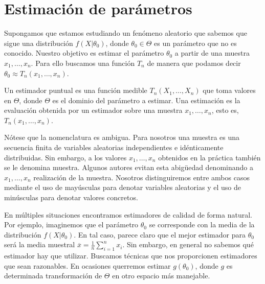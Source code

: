 

\section{Estimación de parámetros} \label{sec:estimacion}

Supongamos que estamos estudiando un fenómeno aleatorio que sabemos que sigue una distribución $f(X | \theta_0)$, donde $\theta_0 \in \Theta$ es un parámetro que no es conocido. Nuestro objetivo es estimar el parámetro $\theta_0$ a partir de una muestra $x_1, \ldots, x_n$. Para ello buscamos una función $T_n$ de manera que podamos decir $\theta_0 \approx T_n(x_1, \ldots, x_n)$.

\begin{definition}
    Un estimador puntual es una función medible $T_n(X_1, \ldots, X_n)$ que toma valores en $\Theta$, donde $\Theta$ es el dominio del parámetro a estimar. Una estimación es la evaluación obtenida por un estimador sobre una muestra $x_1, \ldots, x_n$, esto es, $T_n(x_1, \ldots, x_n)$.
\end{definition}

Nótese que la nomenclatura es ambigua. Para nosotros una muestra es una secuencia finita de variables aleatorias independientes e idénticamente distribuidas. Sin embargo, a los valores $x_1, \ldots, x_n$ obtenidos en la práctica también se le denomina muestra. Algunos autores evitan esta abigüedad denominando a $x_1, \ldots, x_n$ realización de la muestra. Nosotros distinguiremos entre ambos casos mediante el uso de mayúsculas para denotar variables aleatorias y el uso de minúsculas para denotar valores concretos.

En múltiples situaciones encontramos estimadores de calidad de forma natural. Por ejemplo, imaginemos que el parámetro $\theta_0$ se corresponde con la media de la distribución $f(X | \theta_0)$. En tal caso, parece claro que el mejor estimador para $\theta_0$ será la media muestral $\overline{x} = \frac{1}{n}\sum_{i = 1}^n x_i$. Sin embargo, en general no sabemos qué estimador hay que utilizar. Buscamos técnicas que nos proporcionen estimadores que sean razonables. En ocasiones querremos estimar $g(\theta_0)$, donde $g$ es determinada transformación de $\Theta$ en otro espacio más manejable.

